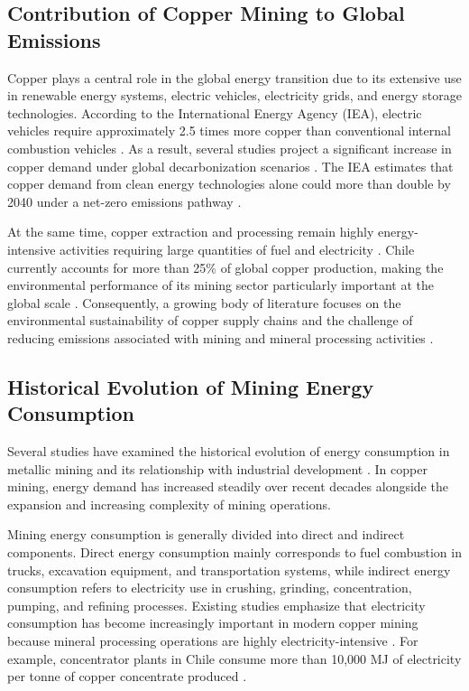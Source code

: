 \subsection{Contribution of Copper Mining to Global Emissions}

Copper plays a central role in the global energy transition due to its extensive use in renewable energy systems, electric vehicles, electricity grids, and energy storage technologies. According to the International Energy Agency (IEA), electric vehicles require approximately 2.5 times more copper than conventional internal combustion vehicles \cite{IEA2021}. As a result, several studies project a significant increase in copper demand under global decarbonization scenarios \cite{Watari2020}. The IEA estimates that copper demand from clean energy technologies alone could more than double by 2040 under a net-zero emissions pathway \cite{IEA2021}.

At the same time, copper extraction and processing remain highly energy-intensive activities requiring large quantities of fuel and electricity \cite{Norgate2010}. Chile currently accounts for more than 25\% of global copper production, making the environmental performance of its mining sector particularly important at the global scale \cite{CochilcoWebsite2025}. Consequently, a growing body of literature focuses on the environmental sustainability of copper supply chains and the challenge of reducing emissions associated with mining and mineral processing activities \cite{Elshkaki2018}.


\subsection{Historical Evolution of Mining Energy Consumption}
\label{sec:evol of mining energy}

Several studies have examined the historical evolution of energy consumption in metallic mining and its relationship with industrial development \cite{Norgate2010,Northey2014}. In copper mining, energy demand has increased steadily over recent decades alongside the expansion and increasing complexity of mining operations.

Mining energy consumption is generally divided into direct and indirect components. Direct energy consumption mainly corresponds to fuel combustion in trucks, excavation equipment, and transportation systems, while indirect energy consumption refers to electricity use in crushing, grinding, concentration, pumping, and refining processes. Existing studies emphasize that electricity consumption has become increasingly important in modern copper mining because mineral processing operations are highly electricity-intensive \cite{Norgate2010}. For example, concentrator plants in Chile consume more than 10,000 MJ of electricity per tonne of copper concentrate produced \cite{Cochilco2024}.

